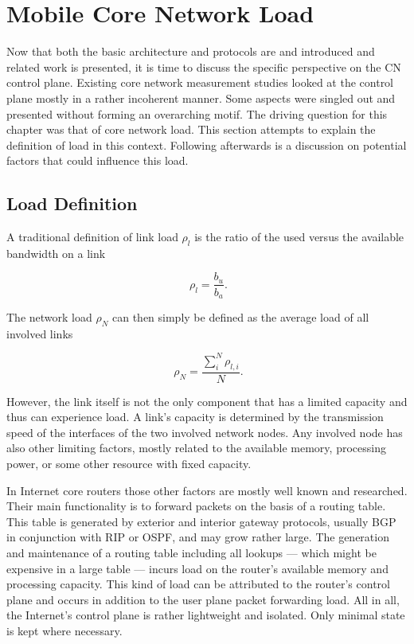 \section{Mobile Core Network Load}
\label{c4:sec:loaddefinition}

Now that both the basic architecture and protocols are and introduced and related work is presented, it is time to discuss the specific perspective on the \gls{CN} control plane. Existing core network measurement studies looked at the control plane mostly in a rather incoherent manner. Some aspects were singled out and presented without forming an overarching motif. The driving question for this chapter was that of core network load. This section attempts to explain the definition of load in this context. Following afterwards is a discussion on potential factors that could influence this load.


\subsection{Load Definition}

A traditional definition of link load $\rho_{l}$ is the ratio of the used versus the available bandwidth on a link

\begin{equation}
	\phantom{.}\rho_{l} = \frac{b_{u}}{b_{a}}\text{.}
\end{equation}

The network load $\rho_{N}$ can then simply be defined as the average load of all involved links

\begin{equation}
	\phantom{.}\rho_{N} = \frac{\sum_{i}^{N} \rho_{l,i}}{N}\text{.}
\end{equation}

However, the link itself is not the only component that has a limited capacity and thus can experience load. A link's capacity is determined by the transmission speed of the interfaces of the two involved network nodes. Any involved node has also other limiting factors, mostly related to the available memory, processing power, or some other resource with fixed capacity.

In Internet core routers those other factors are mostly well known and researched. Their main functionality is to forward packets on the basis of a routing table. This table is generated by exterior and interior gateway protocols, usually \gls{BGP} in conjunction with \gls{RIP} or \gls{OSPF}, and may grow rather large. The generation and maintenance of a routing table including all lookups --- which might be expensive in a large table --- incurs load on the router's available memory and processing capacity. This kind of load can be attributed to the router's control plane and occurs in addition to the user plane packet forwarding load. All in all, the Internet's control plane is rather lightweight and isolated. Only minimal state is kept where necessary.

